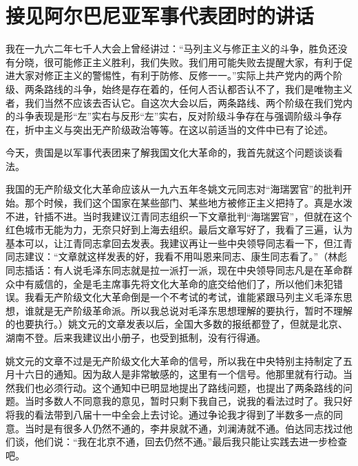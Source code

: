 \section[接见阿尔巴尼亚军事代表团时的讲话（一九六七年五月）]{接见阿尔巴尼亚军事代表团时的讲话}


我在一九六二年七千人大会上曾经讲过：“马列主义与修正主义的斗争，胜负还没有分晓，很可能修正主义胜利，我们失败。我们用可能失败去提醒大家，有利于促进大家对修正主义的警惕性，有利于防修、反修一一。”实际上共产党内的两个阶级、两条路线的斗争，始终是存在着的，任何人否认都否认不了，我们是唯物主义者，我们当然不应该去否认它。自这次大会以后，两条路线、两个阶级在我们党内的斗争表现是形“左”实右与反形“左”实右，反对阶级斗争存在与强调阶级斗争存在，折中主义与突出无产阶级政治等等。在这以前适当的文件中已有了论述。

今天，贵国是以军事代表团来了解我国文化大革命的，我首先就这个问题谈谈看法。

我国的无产阶级文化大革命应该从一九六五年冬姚文元同志对“海瑞罢官”的批判开始。那个时候，我们这个国家在某些部门、某些地方被修正主义把持了。真是水泼不进，针插不进。当时我建议江青同志组织一下文章批判“海瑞罢官”，但就在这个红色城市无能为力，无奈只好到上海去组织。最后文章写好了，我看了三遍，认为基本可以，让江青同志拿回去发表。我建议再让一些中央领导同志看一下，但江青同志建议：“文章就这样发表的好，我看不用叫恩来同志、康生同志看了。”（林彪同志插话：有人说毛泽东同志就是拉一派打一派，现在中央领导同志凡是在革命群众中有威信的，全是毛主席事先将文化大革命的底交给他们了，所以他们未犯错误。我看无产阶级文化大革命倒是一个不考试的考试，谁能紧跟马列主义毛泽东思想，谁就是无产阶级革命派。所以我总说对毛泽东思想理解的要执行，暂时不理解的也要执行。）姚文元的文章发表以后，全国大多数的报纸都登了，但就是北京、湖南不登。后来我建议出小册子，也受到抵制，没有行得通。

姚文元的文章不过是无产阶级文化大革命的信号，所以我在中央特别主持制定了五月十六日的通知。因为敌人是非常敏感的，这里有一个信号。他那里就有行动。当然我们也必须行动。这个通知中已明显地提出了路线问题，也提出了两条路线的问题。当时多数人不同意我的意见，暂时只剩下我自己，说我的看法过时了。我只好将我的看法带到八届十一中全会上去讨论。通过争论我才得到了半数多一点的同意。当时是有很多人仍然不通的，李井泉就不通，刘澜涛就不通。伯达同志找过他们谈，他们说：“我在北京不通，回去仍然不通。”最后我只能让实践去进一步检查吧。

